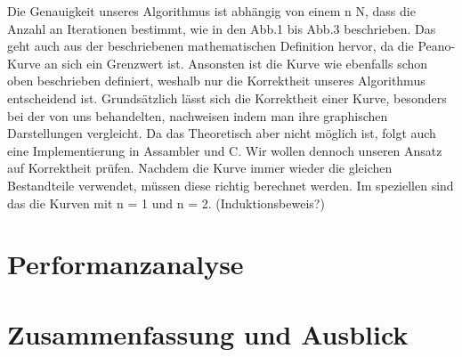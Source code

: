 \documentclass[course=asp]{aspdoc}
\begin{document}
Die Genauigkeit unseres Algorithmus ist abhängig von einem n \in N, dass die Anzahl an Iterationen bestimmt, wie in den Abb.1 bis Abb.3 beschrieben. Das geht auch aus der beschriebenen mathematischen Definition hervor, da die Peano-Kurve an sich ein Grenzwert ist. Ansonsten ist die Kurve wie ebenfalls schon oben beschrieben definiert, weshalb nur die Korrektheit unseres Algorithmus entscheidend ist.
Grundsätzlich lässt sich die Korrektheit einer Kurve, besonders bei der von uns behandelten, nachweisen indem man ihre graphischen Darstellungen vergleicht. Da das Theoretisch aber nicht möglich ist, folgt auch eine Implementierung in Assambler und C.
Wir wollen dennoch unseren Ansatz auf Korrektheit prüfen.
Nachdem die Kurve immer wieder die gleichen Bestandteile verwendet, müssen diese richtig berechnet werden. Im speziellen sind das die Kurven mit n = 1 und n = 2. (Induktionsbeweis?) 

\section{Performanzanalyse}


\section{Zusammenfassung und Ausblick}


{}
\end{document}

